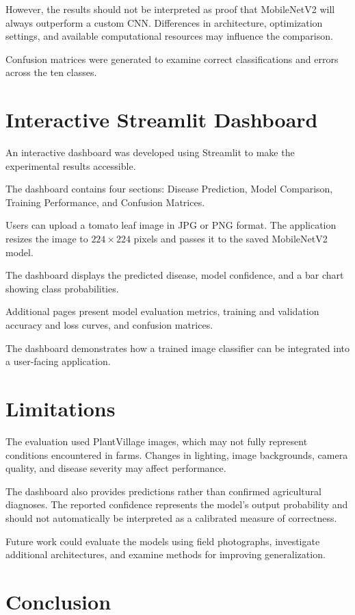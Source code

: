 \documentclass[12pt,a4paper]{article}
\begin{document}
However, the results should not be interpreted as proof that MobileNetV2 will always outperform a custom CNN. Differences in architecture, optimization settings, and available computational resources may influence the comparison.

Confusion matrices were generated to examine correct classifications and errors across the ten classes.

\section{Interactive Streamlit Dashboard}

An interactive dashboard was developed using Streamlit to make the experimental results accessible.

The dashboard contains four sections: Disease Prediction, Model Comparison, Training Performance, and Confusion Matrices.

Users can upload a tomato leaf image in JPG or PNG format. The application resizes the image to $224 \times 224$ pixels and passes it to the saved MobileNetV2 model.

The dashboard displays the predicted disease, model confidence, and a bar chart showing class probabilities.

Additional pages present model evaluation metrics, training and validation accuracy and loss curves, and confusion matrices.

The dashboard demonstrates how a trained image classifier can be integrated into a user-facing application.

\section{Limitations}

The evaluation used PlantVillage images, which may not fully represent conditions encountered in farms. Changes in lighting, image backgrounds, camera quality, and disease severity may affect performance.

The dashboard also provides predictions rather than confirmed agricultural diagnoses. The reported confidence represents the model's output probability and should not automatically be interpreted as a calibrated measure of correctness.

Future work could evaluate the models using field photographs, investigate additional architectures, and examine methods for improving generalization.

\section{Conclusion}
\end{document}
